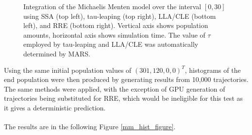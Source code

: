 \documentclass[ugrad,lot,lof,openright,11pt,oneside,onehalfspace]{RUthesis}
\begin{document}
\begin{figure}[H]
{			}
		\captionsetup{width=0.8\textwidth}
		\caption[Integration of the Michaelis Menten model over {$[0,30]$}]{Integration of the Michaelis Menten model over the interval $[0,30]$ using SSA (top left), tau-leaping (top right), LLA/CLE (bottom left), and RRE (bottom right). Vertical axis shows population amounts, horizontal axis shows simulation time. The value of $\tau$ employed by tau-leaping and LLA/CLE was automatically determined by MARS.}
		\label{mm_figure}
		\end{figure}

		\noindent
		Using the same initial population values of $(301,120,0,0)^T$, histograms of the end population were then produced by generating results from 10,000 trajectories. The same methods were applied, with the exception of GPU generation of trajectories being substituted for RRE, which would be ineligible for this test as it gives a deterministic prediction.\\
		\\
		The results are in the following Figure \ref{mm_hist_figure}.
\end{document}
